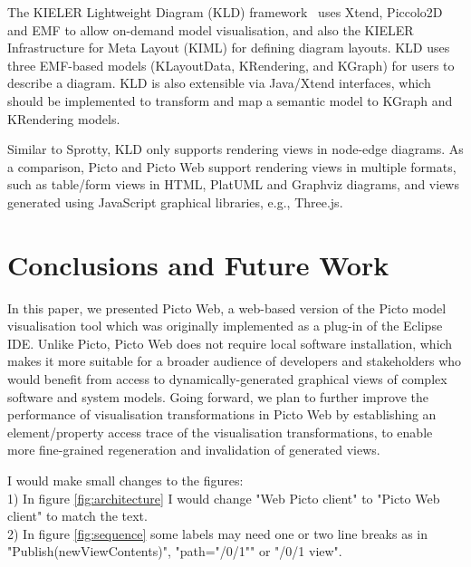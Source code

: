 \documentclass[sigconf,review]{acmart}
\begin{document}
The KIELER Lightweight Diagram (KLD) framework~\cite{schneider2013just} uses Xtend, Piccolo2D and EMF to allow on-demand model visualisation, and also the KIELER Infrastructure for Meta Layout (KIML) for defining diagram layouts. KLD uses three EMF-based models (KLayoutData, KRendering, and KGraph) for users to describe a diagram. KLD is also extensible via Java/Xtend interfaces, which should be implemented to transform and map a semantic model to KGraph and KRendering models.

Similar to Sprotty, KLD only supports rendering views in node-edge diagrams. As a comparison, Picto and Picto Web support rendering views in multiple formats, such as table/form views in HTML, PlatUML and Graphviz diagrams, and views generated using JavaScript graphical libraries, e.g., Three.js.


\section{Conclusions and Future Work}
\label{sec:conclusions_and_future_work}

In this paper, we presented Picto Web, a web-based version of the Picto model visualisation tool which was originally implemented as a plug-in of the Eclipse IDE. Unlike Picto, Picto Web does not require local software installation, which makes it more suitable for a broader audience of developers and stakeholders who would benefit from access to dynamically-generated graphical views of complex software and system models. Going forward, we plan to further improve the performance of visualisation transformations in Picto Web by establishing an element/property access trace of the visualisation transformations, to enable more fine-grained regeneration and invalidation of generated views.

{ \color{blue} 
I would make small changes to the figures:\\
1) In figure \ref{fig:architecture} I would change "Web Picto client" to "Picto Web client" to match the text. \\
2) In figure \ref{fig:sequence} some labels may need one or two line breaks as in  "Publish(newViewContents)", "path="/0/1"" or "/0/1 view".\\
}



\end{document}
